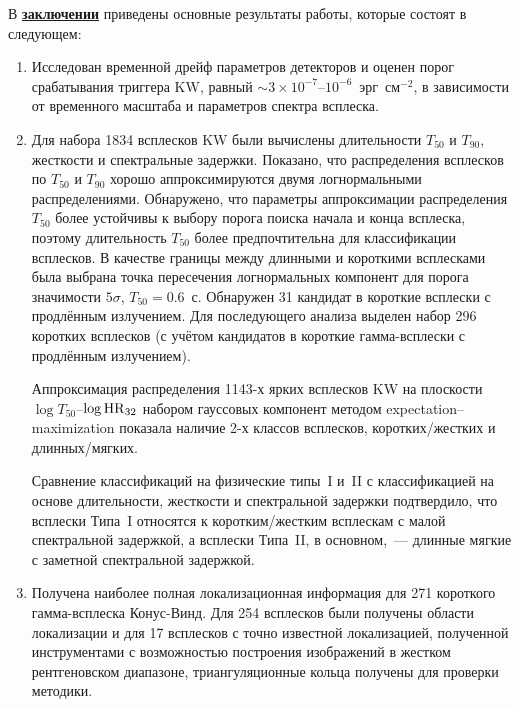 В \underline{\textbf{заключении}} приведены основные результаты работы, 
которые состоят в следующем:
\begin{enumerate}
 
\item Исследован временной дрейф параметров детекторов и оценен порог 
    срабатывания триггера KW, равный $\sim 3\times10^{-7}$--$10^{-6}$~эрг~см$^{-2}$,
    в зависимости от временного масштаба и параметров спектра всплеска. 
    
\item Для набора 1834 всплесков KW были вычислены длительности $T_{50}$ и $T_{90}$, жесткости 
    и спектральные задержки. Показано, что распределения 
    всплесков по $T_{50}$ и $T_{90}$ хорошо аппроксимируются двумя логнормальными 
    распределениями. Обнаружено, что параметры аппроксимации распределения $T_{50}$ 
    более устойчивы к выбору порога поиска начала и конца всплеска, поэтому длительность 
    $T_{50}$ более предпочтительна для классификации всплесков. В качестве границы между 
    длинными и короткими всплесками была выбрана точка пересечения логнормальных компонент 
    для порога значимости $5\sigma$, $T_{50} = 0.6$~с. 
    Обнаружен 31 кандидат в короткие всплески с продлённым излучением.
    Для последующего анализа выделен набор 296 коротких всплесков (с учётом кандидатов 
    в короткие гамма-всплески с продлённым излучением). 
      
    Аппроксимация распределения 1143-х ярких всплесков KW на плоскости $\log T_{50}$--$\log {\mathrm{HR}}_{32}$ 
    набором гауссовых компонент методом expectation–maximization показала наличие 2-х 
    классов всплесков, коротких/жестких и длинных/мягких. 

    Сравнение классификаций на физические типы~I и~II с классификацией на основе 
    длительности, жесткости и спектральной задержки подтвердило, что всплески Типа~I 
    относятся к коротким/жестким всплескам с малой спектральной задержкой, а всплески 
    Типа~II, в основном,~--- длинные мягкие с заметной спектральной задержкой. 
    
\item Получена наиболее полная локализационная информация для 271 короткого 
    гамма-всплеска Конус-Винд. Для 254 всплесков были получены области локализации и 
    для 17 всплесков с точно известной локализацией, полученной инструментами с 
    возможностью построения изображений в жестком рентгеновском диапазоне, триангуляционные
    кольца получены для проверки методики.


\end{enumerate}
